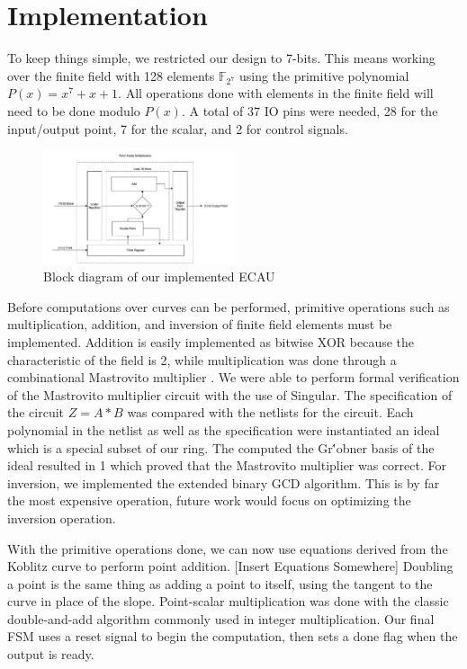 \documentclass{IEEEtran}
\begin{document}
\section{Implementation}

To keep things simple, we restricted our design to 7-bits. This means working over the finite field with 128 elements $\mathbb{F}_{2^7}$ using the primitive polynomial $P(x) = x^7 + x + 1$. All operations done with elements in the finite field will need to be done modulo $P(x)$. A total of 37 IO pins were needed, 28 for the input/output point, 7 for the scalar, and 2 for control signals. 

\begin{figure}%
\centering
\captionsetup{justification=centering}
\includegraphics[width=0.5\textwidth]{images/blockdiagram.png}
\caption{Block diagram of our implemented ECAU}
\label{block}
\end{figure}

Before computations over curves can be performed, primitive operations such as multiplication, addition, and inversion of finite field elements must be implemented. Addition is easily implemented as bitwise XOR because the characteristic of the field is 2, while multiplication was done through a combinational Mastrovito multiplier \cite{Kallabook}. We were able to perform formal verification of the Mastrovito multiplier circuit with the use of Singular. The specification of the circuit $Z=A*B$ was compared with the netlists for the circuit. Each polynomial in the netlist as well as the specification were instantiated an ideal which is a special subset of our ring. The computed the Gr\''{o}bner basis of the ideal resulted in 1 which proved that the Mastrovito multiplier was correct. For inversion, we implemented the extended binary GCD algorithm. This is by far the most expensive operation, future work would focus on optimizing the inversion operation.

With the primitive operations done, we can now use equations derived from the Koblitz curve to perform point addition. [Insert Equations Somewhere] Doubling a point is the same thing as adding a point to itself, using the tangent to the curve in place of the slope. Point-scalar multiplication was done with the classic double-and-add algorithm commonly used in integer multiplication. Our final FSM uses a reset signal to begin the computation, then sets a done flag when the output is ready. 
\end{document}
